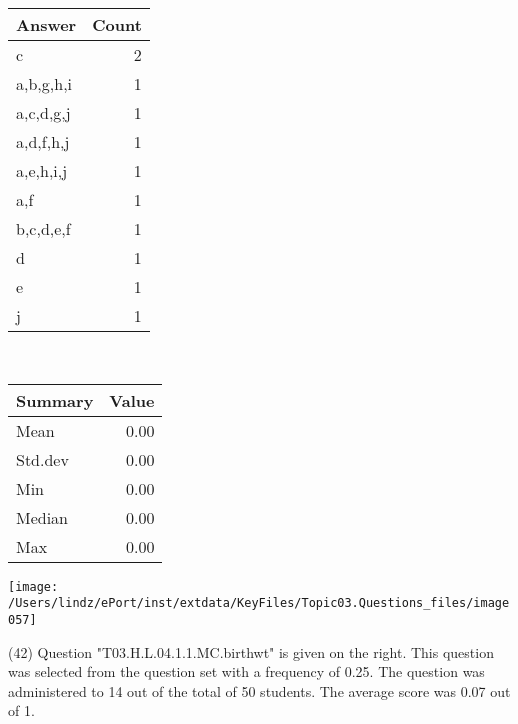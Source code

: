 \documentclass[12pt,english,nohyper]{tufte-handout}\usepackage[]{graphicx}\usepackage[]{color}
\begin{document}
\begin{center}%
\begin{tabular}{lr}
  \hline
Answer & Count \\ 
  \hline
c &   2 \\ 
  a,b,g,h,i &   1 \\ 
  a,c,d,g,j &   1 \\ 
  a,d,f,h,j &   1 \\ 
  a,e,h,i,j &   1 \\ 
  a,f &   1 \\ 
  b,c,d,e,f &   1 \\ 
  d &   1 \\ 
  e &   1 \\ 
  j &   1 \\ 
   \hline
\end{tabular}
~~~~~~~~%
\begin{tabular}{lr}
  \hline
Summary & Value \\ 
  \hline
Mean & 0.00 \\ 
  Std.dev & 0.00 \\ 
  Min & 0.00 \\ 
  Median & 0.00 \\ 
  Max & 0.00 \\ 
   \hline
\end{tabular}
\end{center}\newpage{}



\vspace{5cm}\begin{marginfigure}\texttt{[image: /Users/lindz/ePort/inst/extdata/KeyFiles/Topic03.Questions\_files/image057]}\end{marginfigure}\vspace{-5cm} (42) Question "T03.H.L.04.1.1.MC.birthwt" is given on the right. This question was selected from the question set with a frequency of 0.25. The question was administered to 14 out of the total of 50 students. The average score was 0.07 out of 1.
\end{document}
